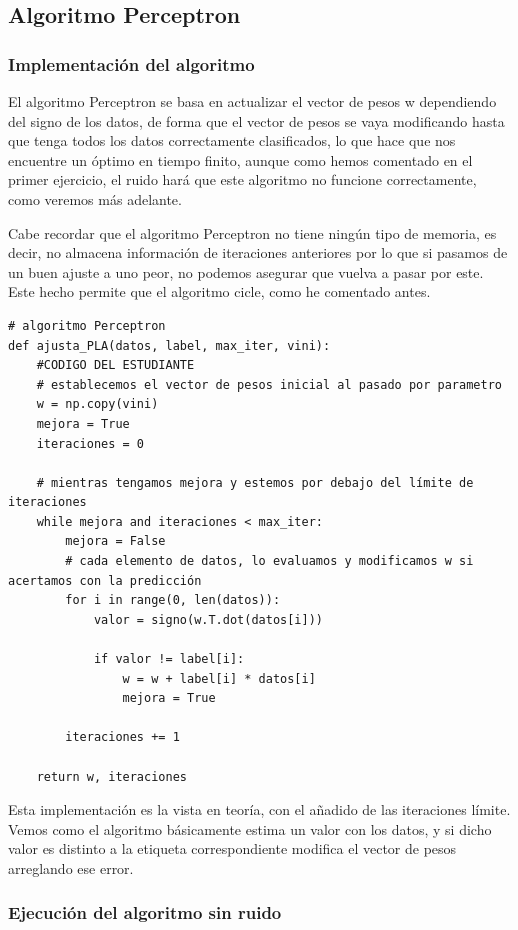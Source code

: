 \documentclass[12pt, spanish]{article}
\begin{document}
\subsection{Algoritmo Perceptron}

\subsubsection{Implementación del algoritmo}

El algoritmo Perceptron se basa en actualizar el vector de pesos w dependiendo del signo de los datos, de forma que el vector de pesos se vaya modificando hasta que tenga todos los datos correctamente clasificados, lo que hace que nos encuentre un óptimo en tiempo finito, aunque como hemos comentado en el primer ejercicio, el ruido hará que este algoritmo no funcione correctamente, como veremos más adelante.

Cabe recordar que el algoritmo Perceptron no tiene ningún tipo de memoria, es decir, no almacena información de iteraciones anteriores por lo que si pasamos de un buen ajuste a uno peor, no podemos asegurar que vuelva a pasar por este. Este hecho permite que el algoritmo cicle, como he comentado antes.

\begin{lstlisting}
# algoritmo Perceptron
def ajusta_PLA(datos, label, max_iter, vini):
    #CODIGO DEL ESTUDIANTE
    # establecemos el vector de pesos inicial al pasado por parametro
	w = np.copy(vini)
	mejora = True
	iteraciones = 0

	# mientras tengamos mejora y estemos por debajo del límite de iteraciones
	while mejora and iteraciones < max_iter:
		mejora = False
		# cada elemento de datos, lo evaluamos y modificamos w si acertamos con la predicción
		for i in range(0, len(datos)):
			valor = signo(w.T.dot(datos[i]))

			if valor != label[i]:
				w = w + label[i] * datos[i]
				mejora = True

		iteraciones += 1

	return w, iteraciones

\end{lstlisting}

Esta implementación es la vista en teoría, con el añadido de las iteraciones límite. Vemos como el algoritmo básicamente estima un valor con los datos, y si dicho valor es distinto a la etiqueta correspondiente modifica el vector de pesos arreglando ese error.

\subsubsection{Ejecución del algoritmo sin ruido}
\end{document}
